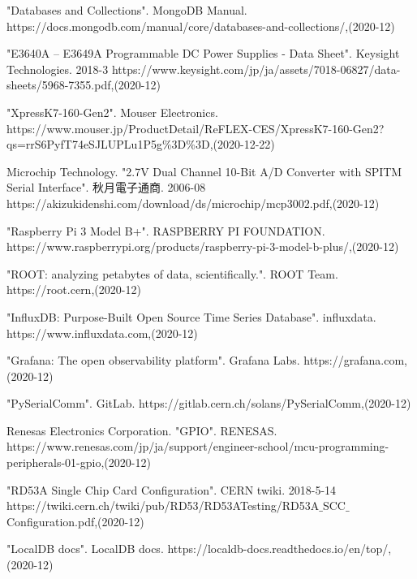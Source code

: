 \begin{thebibliography}{9}
"Databases and Collections". MongoDB Manual. 
https://docs.mongodb.com/manual/core/databases-and-collections/,(2020-12)

"E3640A – E3649A Programmable DC Power Supplies - Data Sheet". Keysight Technologies. 2018-3
https://www.keysight.com/jp/ja/assets/7018-06827/data-sheets/5968-7355.pdf,(2020-12)

"XpressK7-160-Gen2". Mouser Electronics.
https://www.mouser.jp/ProductDetail/ReFLEX-CES/XpressK7-160-Gen2?qs=rrS6PyfT74eSJLUPLu1P5g\%3D\%3D,(2020-12-22)

Microchip Technology. "2.7V Dual Channel 10-Bit A/D Converter with SPITM Serial Interface". 秋月電子通商. 2006-08
https://akizukidenshi.com/download/ds/microchip/mcp3002.pdf,(2020-12)

"Raspberry Pi 3 Model B+". RASPBERRY PI FOUNDATION. 
https://www.raspberrypi.org/products/raspberry-pi-3-model-b-plus/,(2020-12)

"ROOT: analyzing petabytes of data, scientifically.". ROOT Team. 
https://root.cern,(2020-12)

"InfluxDB: Purpose-Built Open Source Time Series Database". influxdata. 
https://www.influxdata.com,(2020-12)

"Grafana: The open observability platform". Grafana Labs. 
https://grafana.com,(2020-12)

"PySerialComm". GitLab. 
https://gitlab.cern.ch/solans/PySerialComm,(2020-12)

Renesas Electronics Corporation. "GPIO". RENESAS.  
https://www.renesas.com/jp/ja/support/engineer-school/mcu-programming-peripherals-01-gpio,(2020-12)

"RD53A Single Chip Card Configuration". CERN twiki. 2018-5-14 
https://twiki.cern.ch/twiki/pub/RD53/RD53ATesting/RD53A$\_$SCC$\_$Configuration.pdf,(2020-12)

"LocalDB docs". LocalDB docs. 
https://localdb-docs.readthedocs.io/en/top/,(2020-12)

\end{thebibliography}
